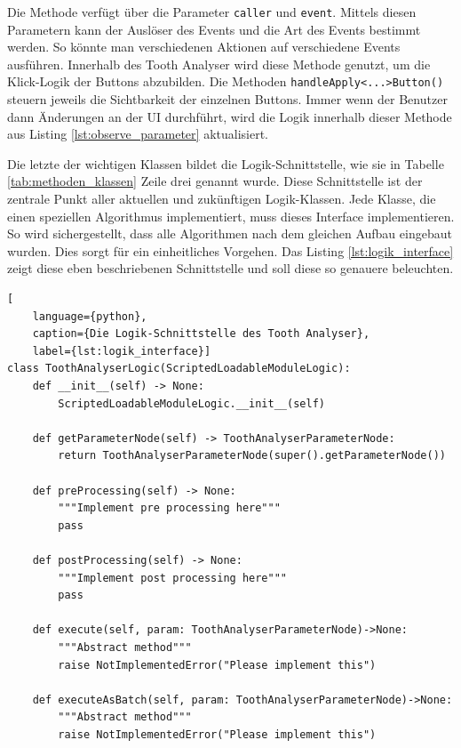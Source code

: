 Die Methode verfügt über die Parameter \texttt{caller} und \texttt{event}. Mittels
diesen Parametern kann der Auslöser des Events und die Art des Events bestimmt werden.
So könnte man verschiedenen Aktionen auf verschiedene Events ausführen. Innerhalb
des Tooth Analyser wird diese Methode genutzt, um die Klick-Logik der Buttons
abzubilden. Die Methoden \texttt{handleApply<...>Button()} steuern jeweils die
Sichtbarkeit der einzelnen Buttons. Immer wenn der Benutzer dann Änderungen an der
UI durchführt, wird die Logik innerhalb dieser Methode aus Listing
\ref{lst:observe_parameter} aktualisiert.

Die letzte der wichtigen Klassen bildet die Logik-Schnittstelle, wie sie in Tabelle
\ref{tab:methoden_klassen} Zeile drei genannt wurde. Diese Schnittstelle ist der
zentrale Punkt aller aktuellen und zukünftigen Logik-Klassen. Jede Klasse, die
einen speziellen Algorithmus implementiert, muss dieses Interface implementieren.
So wird sichergestellt, dass alle Algorithmen nach dem gleichen Aufbau eingebaut
wurden. Dies sorgt für ein einheitliches Vorgehen. Das Listing \ref{lst:logik_interface}
zeigt diese eben beschriebenen Schnittstelle und soll diese so genauere beleuchten.

\pagebreak

\begin{lstlisting}[
    language={python},
    caption={Die Logik-Schnittstelle des Tooth Analyser},
    label={lst:logik_interface}]
class ToothAnalyserLogic(ScriptedLoadableModuleLogic):
    def __init__(self) -> None:
        ScriptedLoadableModuleLogic.__init__(self)

    def getParameterNode(self) -> ToothAnalyserParameterNode:
        return ToothAnalyserParameterNode(super().getParameterNode())

    def preProcessing(self) -> None:
        """Implement pre processing here"""
        pass

    def postProcessing(self) -> None:
        """Implement post processing here"""
        pass

    def execute(self, param: ToothAnalyserParameterNode)->None:
        """Abstract method"""
        raise NotImplementedError("Please implement this")

    def executeAsBatch(self, param: ToothAnalyserParameterNode)->None:
        """Abstract method"""
        raise NotImplementedError("Please implement this")
\end{lstlisting}

